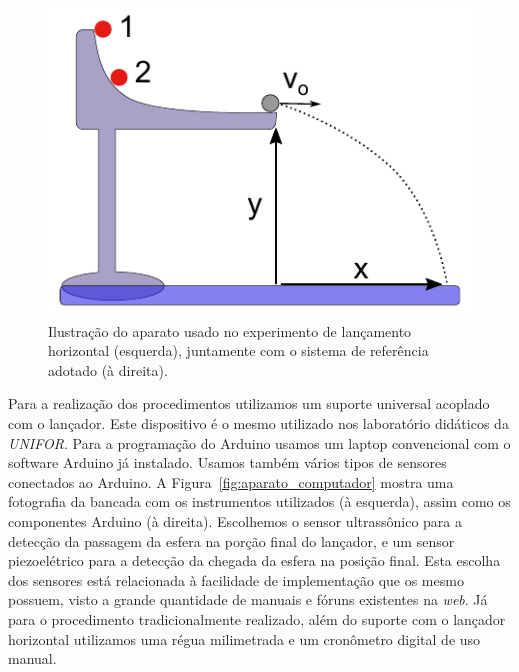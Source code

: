 \documentclass[article,11pt,a4paper]{abntex2}
\begin{document}
\begin{figure}[!hbt]
\centering
\includegraphics[scale=0.6]{figs/lancamento_suporte.pdf}
\caption{Ilustração do aparato usado no experimento de lançamento horizontal (esquerda), juntamente com o sistema de referência adotado (à direita).}
\label{fig:desenho_lancador}
\end{figure}


Para a realização dos procedimentos utilizamos um suporte universal acoplado com o lançador.
Este dispositivo é o mesmo utilizado nos laboratório didáticos da \emph{UNIFOR}.
Para a programação do Arduino usamos um laptop convencional com o software Arduino já instalado.
Usamos também vários tipos de sensores conectados ao Arduino.
A Figura~\ref{fig:aparato_computador} mostra uma fotografia da bancada com os instrumentos utilizados (à esquerda), assim como os componentes Arduino (à direita).
Escolhemos o sensor ultrassônico para a detecção da passagem da esfera na porção final do lançador, e um sensor piezoelétrico para a detecção da chegada da esfera na posição final. Esta escolha dos sensores está relacionada à facilidade de implementação que os mesmo possuem, visto a grande quantidade de manuais e fóruns existentes na \textit{web}.
Já para o procedimento tradicionalmente realizado, além do suporte com o lançador horizontal utilizamos uma régua milimetrada e um cronômetro digital de uso manual.
\end{document}
